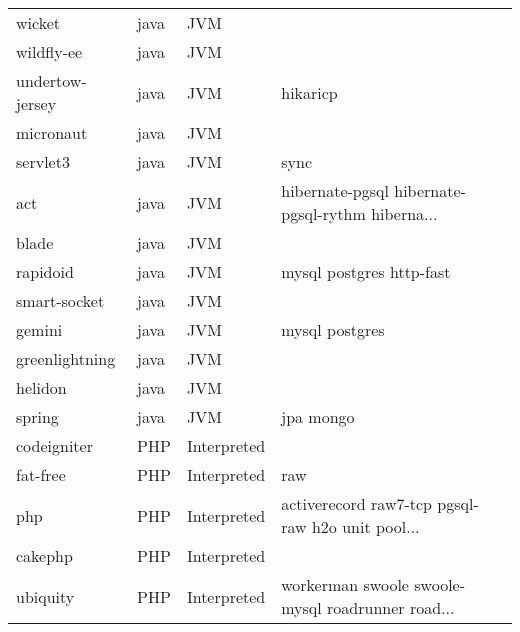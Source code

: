 \begin{longtable}{llll}
    wicket           & java        & JVM         &                                                    \\
    wildfly-ee       & java        & JVM         &                                                    \\
    undertow-jersey  & java        & JVM         & hikaricp                                           \\
    micronaut        & java        & JVM         &                                                    \\
    servlet3         & java        & JVM         & sync                                               \\
    act              & java        & JVM         & hibernate-pgsql hibernate-pgsql-rythm hiberna...   \\
    blade            & java        & JVM         &                                                    \\
    rapidoid         & java        & JVM         & mysql postgres http-fast                           \\
    smart-socket     & java        & JVM         &                                                    \\
    gemini           & java        & JVM         & mysql postgres                                     \\
    greenlightning   & java        & JVM         &                                                    \\
    helidon          & java        & JVM         &                                                    \\
    spring           & java        & JVM         & jpa mongo                                          \\
    codeigniter      & PHP         & Interpreted &                                                    \\
    fat-free         & PHP         & Interpreted & raw                                                \\
    php              & PHP         & Interpreted & activerecord raw7-tcp pgsql-raw h2o unit pool...   \\
    cakephp          & PHP         & Interpreted &                                                    \\
    ubiquity         & PHP         & Interpreted & workerman swoole swoole-mysql roadrunner road...   \\

\end{longtable}
